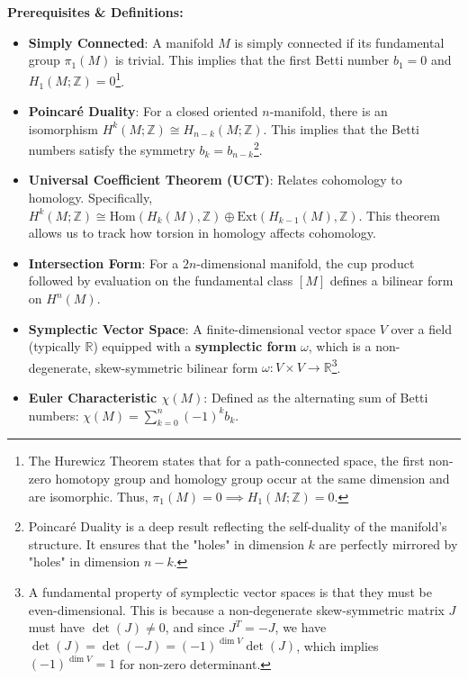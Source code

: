 \begin{solution}
\textbf{Prerequisites \& Definitions:}
\begin{itemize}
    \item \textbf{Simply Connected}: A manifold $M$ is simply connected if its fundamental group $\pi_1(M)$ is trivial. This implies that the first Betti number $b_1 = 0$ and $H_1(M; \mathbb{Z}) = 0$\footnote{The Hurewicz Theorem states that for a path-connected space, the first non-zero homotopy group and homology group occur at the same dimension and are isomorphic. Thus, $\pi_1(M) = 0 \implies H_1(M; \mathbb{Z}) = 0$.}.
    \item \textbf{Poincaré Duality}: For a closed oriented $n$-manifold, there is an isomorphism $H^k(M; \mathbb{Z}) \cong H_{n-k}(M; \mathbb{Z})$. This implies that the Betti numbers satisfy the symmetry $b_k = b_{n-k}$\footnote{Poincaré Duality is a deep result reflecting the self-duality of the manifold's structure. It ensures that the "holes" in dimension $k$ are perfectly mirrored by "holes" in dimension $n-k$.}.
    \item \textbf{Universal Coefficient Theorem (UCT)}: Relates cohomology to homology. Specifically, $H^k(M; \mathbb{Z}) \cong \text{Hom}(H_k(M), \mathbb{Z}) \oplus \text{Ext}(H_{k-1}(M), \mathbb{Z})$. This theorem allows us to track how torsion in homology affects cohomology.
    \item \textbf{Intersection Form}: For a $2n$-dimensional manifold, the cup product followed by evaluation on the fundamental class $[M]$ defines a bilinear form on $H^n(M)$.
    \item \textbf{Symplectic Vector Space}: A finite-dimensional vector space $V$ over a field (typically $\mathbb{R}$) equipped with a \textbf{symplectic form} $\omega$, which is a non-degenerate, skew-symmetric bilinear form $\omega: V \times V \to \mathbb{R}$\footnote{A fundamental property of symplectic vector spaces is that they must be even-dimensional. This is because a non-degenerate skew-symmetric matrix $J$ must have $\det(J) \neq 0$, and since $J^T = -J$, we have $\det(J) = \det(-J) = (-1)^{\dim V} \det(J)$, which implies $(-1)^{\dim V} = 1$ for non-zero determinant.}.
    \item \textbf{Euler Characteristic $\chi(M)$}: Defined as the alternating sum of Betti numbers: $\chi(M) = \sum_{k=0}^n (-1)^k b_k$.
\end{itemize}


\end{solution}
